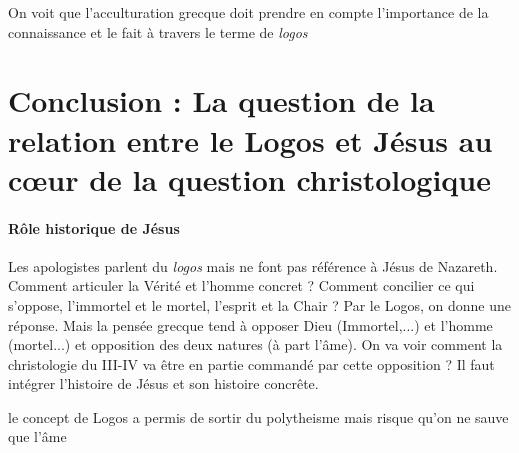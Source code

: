 \begin{Synthesis}
    On voit que l'acculturation grecque doit prendre en compte l'importance de la connaissance et le fait à travers le terme de \textit{logos}
\end{Synthesis}




\hypertarget{conclusion-la-question-de-la-relation-entre-le-logos-et-juxe9sus-au-cux153ur-de-la-question-christologique}{%
\section{Conclusion : La question de la relation entre le Logos et
Jésus au cœur de la question
christologique}\label{conclusion-la-question-de-la-relation-entre-le-logos-et-juxe9sus-au-cux153ur-de-la-question-christologique}}


\paragraph{Rôle historique de Jésus} Les apologistes parlent du \textit{logos} mais ne font pas référence à Jésus de Nazareth. Comment articuler la Vérité et l'homme concret ? Comment concilier ce qui s'oppose, l'immortel et le mortel, l'esprit et la Chair ? Par le Logos, on donne une réponse. 
Mais la pensée grecque tend à opposer Dieu (Immortel,...) et l'homme (mortel...) et opposition des deux natures (à part l'âme). On va voir comment la christologie du III-IV va être en partie commandé par cette opposition ?
Il faut intégrer l'histoire de Jésus et son histoire concrête. 

 
\begin{Synthesis}
    le concept de Logos a permis de sortir du polytheisme mais risque qu'on ne sauve que l'âme
\end{Synthesis}







